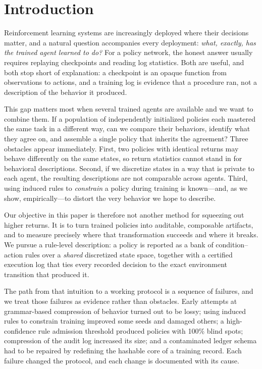 \documentclass[11pt]{article}
\begin{document}
\section{Introduction}
\label{sec:intro}

Reinforcement learning systems are increasingly deployed where their decisions matter, and a natural
question accompanies every deployment: \emph{what, exactly, has the trained agent learned to do?}
For a policy network, the honest answer usually requires replaying checkpoints and reading log
statistics. Both are useful, and both stop short of explanation: a checkpoint is an opaque function
from observations to actions, and a training log is evidence that a procedure ran, not a description
of the behavior it produced.

This gap matters most when several trained agents are available and we want to combine them. If a
population of independently initialized policies each mastered the same task in a different way, can
we compare their behaviors, identify what they agree on, and assemble a single policy that inherits
the agreement? Three obstacles appear immediately. First, two policies with identical returns may
behave differently on the same states, so return statistics cannot stand in for behavioral
descriptions. Second, if we discretize states in a way that is private to each agent, the resulting
descriptions are not comparable across agents. Third, using induced rules to \emph{constrain} a
policy during training is known---and, as we show, empirically---to distort the very behavior we
hope to describe.

Our objective in this paper is therefore not another method for squeezing out higher returns. It is
to turn trained policies into auditable, composable artifacts, and to measure precisely where that
transformation succeeds and where it breaks. We pursue a rule-level description: a policy is
reported as a bank of condition--action rules over a \emph{shared} discretized state space, together
with a certified execution log that ties every recorded decision to the exact environment transition
that produced it.

The path from that intuition to a working protocol is a sequence of failures, and we treat those
failures as evidence rather than obstacles. Early attempts at grammar-based compression of behavior
turned out to be lossy; using induced rules to constrain training improved some seeds and damaged
others; a high-confidence rule admission threshold produced policies with 100\% blind spots;
compression of the audit log increased its size; and a contaminated ledger schema had to be repaired
by redefining the hashable core of a training record. Each failure changed the protocol, and each
change is documented with its cause.
\end{document}
